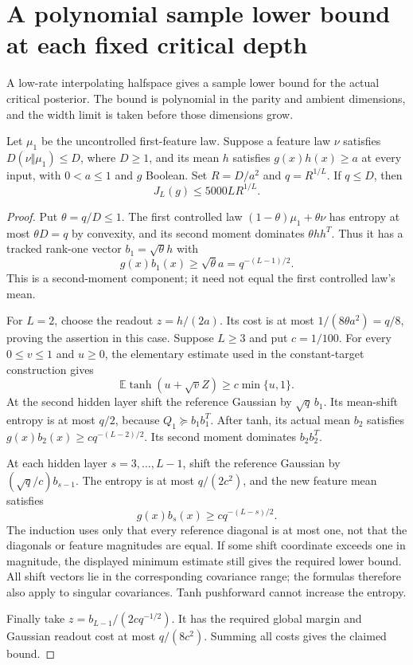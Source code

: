 \section{A polynomial sample lower bound at each fixed critical depth}
\label{sec:critical-polynomial-sample-lower}

A low-rate interpolating halfspace gives a sample lower bound for the
actual critical posterior. The bound is polynomial in the parity and
ambient dimensions, and the width limit is taken before those dimensions
grow.

\begin{lemma}
\label{lem:critical-mixture-mean-seed}
Let $\mu_1$ be the uncontrolled first-feature law. Suppose a feature law
$\nu$ satisfies $D(\nu\Vert\mu_1)\le D$, where $D\ge1$, and its mean
$h$ satisfies $g(x)h(x)\ge a$ at every input, with $0<a\le1$ and
$g$ Boolean. Set $R=D/a^2$ and $q=R^{1/L}$. If $q\le D$, then
\[
 J_L(g)\le5000L R^{1/L}.
\]
\end{lemma}

\begin{proof}
Put $\theta=q/D\le1$. The first controlled law
$(1-\theta)\mu_1+\theta\nu$ has entropy at most $\theta D=q$ by
convexity, and its second moment dominates
$\theta hh^T$. Thus it has a tracked rank-one vector
$b_1=\sqrt\theta h$ with
\[
 g(x)b_1(x)\ge\sqrt\theta a=q^{-(L-1)/2}.
\]
This is a second-moment component; it need not equal the first
controlled law's mean.

For $L=2$, choose the readout $z=h/(2a)$. Its cost is at most
$1/(8\theta a^2)=q/8$, proving the assertion in this case.
Suppose $L\ge3$ and put $c=1/100$. For every $0\le v\le1$ and
$u\ge0$, the elementary estimate used in the constant-target
construction gives
\[
 \mathbb E\tanh(u+\sqrt v Z)\ge c\min\{u,1\}.
\]
At the second hidden layer shift the reference Gaussian by
$\sqrt q\,b_1$. Its mean-shift entropy is at most $q/2$, because
$Q_1\succeq b_1b_1^T$. After tanh, its actual mean $b_2$ satisfies
$g(x)b_2(x)\ge c q^{-(L-2)/2}$. Its second moment dominates
$b_2b_2^T$.

At each hidden layer $s=3,\ldots,L-1$, shift the reference Gaussian
by $(\sqrt q/c)b_{s-1}$. The entropy is at most $q/(2c^2)$, and
the new feature mean satisfies
\[
 g(x)b_s(x)\ge c q^{-(L-s)/2}.
\]
The induction uses only that every reference diagonal is at most one,
not that the diagonals or feature magnitudes are equal. If some shift
coordinate exceeds one in magnitude, the displayed minimum estimate
still gives the required lower bound. All shift vectors lie in the
corresponding covariance range; the formulas therefore also apply to
singular covariances. Tanh pushforward cannot increase the entropy.

Finally take $z=b_{L-1}/(2c q^{-1/2})$. It has the required global
margin and Gaussian readout cost at most $q/(8c^2)$. Summing all
costs gives the claimed bound.
\end{proof}

